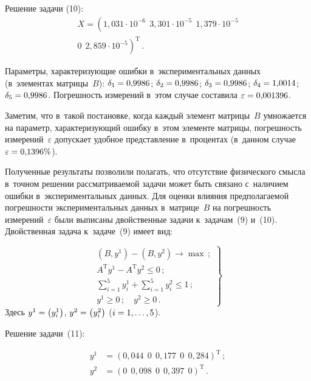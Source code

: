 \begin{multicols}{2}
  Решение задачи (10):
  \begin{multline*}
  X=\left( 1{,}031\cdot 10^{-6}\ \ 3{,}301\cdot 10^{-5}\ \
  1{,}379\cdot 10^{-5}\right.\\
\left. 0 \ \ 2{,}859\cdot 10^{-5}\right)^{\mathrm{T}}\,.
  \end{multline*}

  Параметры, характеризующие ошибки в~экспериментальных данных
(в~элементах матрицы~$B$):
$\delta_1\hm= 0{,}9986$; $\delta_2\hm=0{,}9986$;
$\delta_3\hm=0{,}9986$; $\delta_4\hm= 1{,}0014$;
$\delta_5\hm=0{,}9986$.
  По\-греш\-ность измерений в~этом случае составила $\varepsilon\hm=
0{,}001396$.

  Заметим, что в~такой постановке, когда каждый элемент матрицы~$B$
умножается на параметр, характеризующий ошибку в~этом элементе матрицы,
погрешность измерений~$\varepsilon$ допускает удобное представление
в~процентах (в~данном случае $\varepsilon\hm=0{,}1396\%$).

  Полученные результаты позволили полагать, что отсутствие физического
смысла в~точном решении рассматриваемой задачи может быть связано с~наличием ошибки в~экспериментальных данных. Для оценки влияния
предполагаемой по\-греш\-ности экспериментальных данных в~матрице~$B$ на
по\-греш\-ность измерений~$\varepsilon$ были выписаны двойственные задачи
к~задачам~(9) и~(10). Двойственная задача к~задаче~(9) имеет вид:

\noindent
  \begin{equation}
  \left.
  \begin{array}{c}
  \left( B,y^1\right) - \left( B, y^2\right) \to \max\,;\\[6pt]
  A^{\mathrm{T}} y^1- A^{\mathrm{T}} y^2\leq 0\,;\\[2pt]
  \displaystyle \sum\limits_{i=1}^5 y_i^1 +\sum\limits_{i=1}^5 y_i^2\leq 1\,;\\[10pt]
  y^1\geq0\,; \quad y^2\geq 0\,.
  \end{array}
  \right\}
  \label{e11-spi}
  \end{equation}
  Здесь $y^1\hm=\left( y_i^1\right)$, $y^2\hm=\left( y_i^2\right)$ ($i\hm=1,\ldots
,5$).

  Решение задачи~(11):

  \noindent
  \begin{align*}
  y^1 &= \left( 0{,}044\ \ 0\ \ 0{,}177 \ \ 0\ \ 0{,}284\right)^{\mathrm{T}}\,;\\
  y^2&= \left( 0 \ \ 0{,}098\ \ 0\ \ 0{,}397\ \ 0\right)^{\mathrm{T}}\,.
  \end{align*}


\end{multicols}
